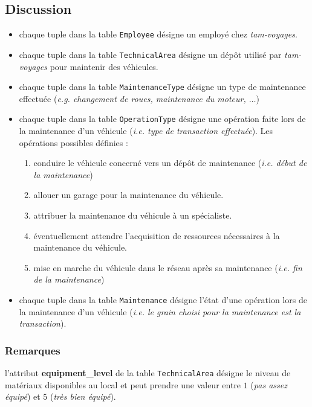 \documentclass[a4paper,12pt]{report}
\begin{document}
\subsection{Discussion}
\begin{itemize}
  \item chaque tuple dans la table \texttt{Employee} désigne un employé chez \textit{tam-voyages}.
  \item chaque tuple dans la table \texttt{TechnicalArea} désigne un dépôt utilisé par \textit{tam-voyages} pour maintenir des véhicules.
  \item chaque tuple dans la table \texttt{MaintenanceType} désigne un type de maintenance effectuée (\textit{e.g. changement de roues, maintenance du moteur, $\dots$})
  \item chaque tuple dans la table \texttt{OperationType} désigne une opération faite lors de la maintenance d'un véhicule (\textit{i.e. type de transaction effectuée}). Les opérations possibles définies :
  \begin{enumerate}
    \item conduire le véhicule concerné vers un dépôt de maintenance (\textit{i.e. début de la maintenance})
    \item allouer un garage pour la maintenance du véhicule.
    \item attribuer la maintenance du véhicule à un spécialiste.
    \item éventuellement attendre l'acquisition de ressources nécessaires à la maintenance du véhicule.
    \item mise en marche du véhicule dans le réseau après sa maintenance (\textit{i.e. fin de la maintenance})
  \end{enumerate}
  \item chaque tuple dans la table \texttt{Maintenance} désigne l'état d'une opération lors de la maintenance d'un véhicule (\textit{i.e. le grain choisi pour la maintenance est la transaction}).
\end{itemize}

\subsubsection{Remarques}
l'attribut \textbf{equipment\_level} de la table \texttt{TechnicalArea} désigne le niveau de matériaux disponibles au local et peut prendre une valeur entre $1$ (\textit{pas assez équipé}) et $5$ (\textit{très bien équipé}).
\end{document}
